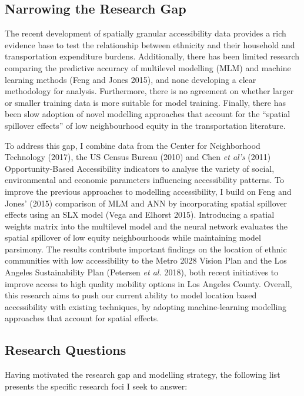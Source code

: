\documentclass[a4paper,UKenglish]{lipics-v2018}
\begin{document}
\subsection{Narrowing the Research Gap}
The recent development of spatially granular accessibility data provides a rich evidence base to test the relationship between ethnicity and their household and transportation expenditure burdens. Additionally, there has been limited research comparing the predictive accuracy of multilevel modelling (MLM) and machine learning methods (Feng and Jones 2015), and none developing a clear methodology for analysis. Furthermore, there is no agreement on whether larger or smaller training data is more suitable for model training. Finally, there has been slow adoption of novel modelling approaches that account for the “spatial spillover effects” of low neighbourhood equity in the transportation literature.

To address this gap, I combine data from the Center for Neighborhood Technology (2017), the US Census Bureau (2010) and Chen \textit{et al's} (2011) Opportunity-Based Accessibility indicators to analyse the variety of social, environmental and economic parameters influencing accessibility patterns. To improve the previous approaches to modelling accessibility, I build on Feng and Jones’ (2015) comparison of MLM and ANN by incorporating spatial spillover effects using an SLX model (Vega and Elhorst 2015). Introducing a spatial weights matrix into the multilevel model and the neural network evaluates the spatial spillover of low equity neighbourhoods while maintaining model parsimony. The results contribute important findings on the location of ethnic communities with low accessibility to the Metro 2028 Vision Plan and the Los Angeles Sustainability Plan (Petersen \textit{et al.} 2018), both recent initiatives to improve access to high quality mobility options in Los Angeles County. Overall, this research aims to push our current ability to model location based accessibility with existing techniques, by adopting machine-learning modelling approaches that account for spatial effects. 

\subsection{Research Questions}
Having motivated the research gap and modelling strategy, the following list presents the specific research foci I seek to answer: 
\end{document}
